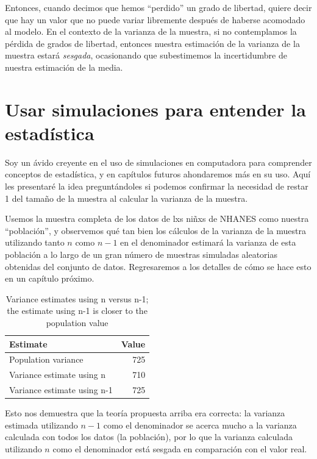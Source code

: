 \documentclass[
  12pt,
]{book}
\begin{document}
Entonces, cuando decimos que hemos ``perdido'' un grado de libertad, quiere decir que hay un valor que no puede variar libremente después de haberse acomodado al modelo. En el contexto de la varianza de la muestra, si no contemplamos la pérdida de grados de libertad, entonces nuestra estimación de la varianza de la muestra estará \emph{sesgada}, ocasionando que subestimemos la incertidumbre de nuestra estimación de la media.

\hypertarget{usar-simulaciones-para-entender-la-estaduxedstica}{%
\section{Usar simulaciones para entender la estadística}\label{usar-simulaciones-para-entender-la-estaduxedstica}}

Soy un ávido creyente en el uso de simulaciones en computadora para comprender conceptos de estadística, y en capítulos futuros ahondaremos más en su uso. Aquí les presentaré la idea preguntándoles si podemos confirmar la necesidad de restar 1 del tamaño de la muestra al calcular la varianza de la muestra.

Usemos la muestra completa de los datos de lxs niñxs de NHANES como nuestra ``población'', y observemos qué tan bien los cálculos de la varianza de la muestra utilizando tanto \(n\) como \(n-1\) en el denominador estimará la varianza de esta población a lo largo de un gran número de muestras simuladas aleatorias obtenidas del conjunto de datos. Regresaremos a los detalles de cómo se hace esto en un capítulo próximo.

\begin{table}

\caption{\label{tab:unnamed-chunk-22}Variance estimates using n versus n-1; the estimate using n-1 is closer to the population value}
\centering
\begin{tabular}[t]{l|r}
\hline
Estimate & Value\\
\hline
Population variance & 725\\
\hline
Variance estimate using n & 710\\
\hline
Variance estimate using n-1 & 725\\
\hline
\end{tabular}
\end{table}

Esto nos demuestra que la teoría propuesta arriba era correcta: la varianza estimada utilizando \(n - 1\) como el denominador se acerca mucho a la varianza calculada con todos los datos (la población), por lo que la varianza calculada utilizando \(n\) como el denominador está sesgada en comparación con el valor real.
\end{document}
